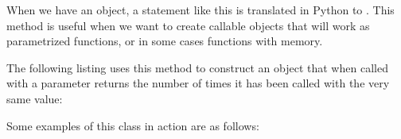 \documentclass[a4paper,10pt,english]{sphinxmanual}
\begin{document}
When we have an object, a statement like this  is translated in Python to
. This method is useful when we want to create callable objects that will work as
parametrized functions, or in some cases functions with memory.

The following listing uses this method to construct an object that when called with a parameter returns the number of
times it has been called with the very same value:

\begin{sphinxVerbatim}[commandchars=\\\{\}]
   

 
     
          

      
        \PYG{p}{[}\PYG{p}{]}  
         \PYG{p}{[}\PYG{p}{]}
\end{sphinxVerbatim}

Some examples of this class in action are as follows:

\begin{sphinxVerbatim}[commandchars=\\\{\}]
  
\end{sphinxVerbatim}
\end{document}
